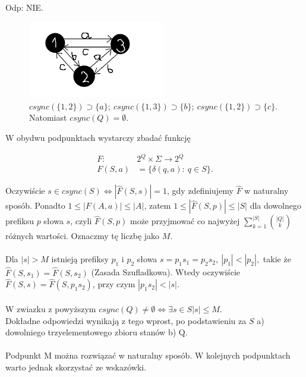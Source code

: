 \documentclass[a4paper,11pt]{article}
\newenvironment{zadanie}[1]
  {\renewcommand\theinnercustomthm{#1}\innercustomthm}
  {\endinnercustomthm}
\begin{document}
Odp: NIE. \\


\begin{figure}[h!]
  \centerline{%
    \includegraphics[width=6cm]{zad40.png}%
  }%
  \caption{$csync(\{1,2\}) \supset \{a\}; \ csync(\{1,3\}) \supset \{b\};\ csync(\{1,2\}) \supset \{c\}$. Natomiast $csync(Q) = \emptyset $.}
\end{figure}


\begin{zadanie}{41}
\end{zadanie}
W obydwu podpunktach wystarczy zbadać funkcję

\begin{align*}
 F :\ &2^Q \times \Sigma \longrightarrow 2^Q \\
 F(S,a) &= \{ \delta(q,a) : \ q \in S \}.
\end{align*}

Oczywiście $s \in csync(S) \Longleftrightarrow |\widehat{F}(S,s)| = 1$, gdy zdefiniujemy $\widehat{F}$ w naturalny sposób. 
Ponadto $1 \leqslant |F(A,a)| \leqslant |A|$, zatem $1 \leqslant |\widehat{F}(S,p)| \leqslant |S|$ dla dowolnego prefiksu $p$ słowa $s$,
czyli $\widehat{F}(S,p)$ może przyjmować co najwyżej $\displaystyle{\sum\limits^{|S|}_{k=1}\binom{|Q|}{k}}$ różnych wartości.
Oznaczmy tę liczbę jako $M$. \\ \\

Dla $|s| > M$ istnieją prefiksy $p_1$ i $p_2$ słowa $s = p_1s_1 = p_2s_2, \ |p_1| < |p_2|,$ takie że 
$\widehat{F}(S,s_1) = \widehat{F}(S,s_2)$ (Zasada Szufladkowa). Wtedy oczywiście $\widehat{F}(S,s) = \widehat{F}(S,p_1s_2)$, przy czym 
$|p_1s_2| < |s|$. \\ \\
W zwiazku z powyższym $csync(Q) \neq \emptyset \Longleftrightarrow \exists s \in S |s| \leqslant M$. \\
Dokładne odpowiedzi wynikają z tego wprost, po podstawieniu za $S$ a) dowolniego trzyelementowego zbioru stanów b) Q. \\ \\

\begin{zadanie}{42}
\end{zadanie}
Podpunkt M można rozwiązać w naturalny sposób. W kolejnych podpunktach warto jednak skorzystać ze wskazówki. \\ \\
\end{document}
